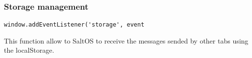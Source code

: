 \documentclass[a4paper]{article}
\begin{document}
\hypertarget{toc313}{}
\subsubsection{Storage management}

\begin{lstlisting}
window.addEventListener('storage', event
\end{lstlisting}

This function allow to SaltOS to receive the messages sended by other tabs
using the localStorage.

\end{document}

